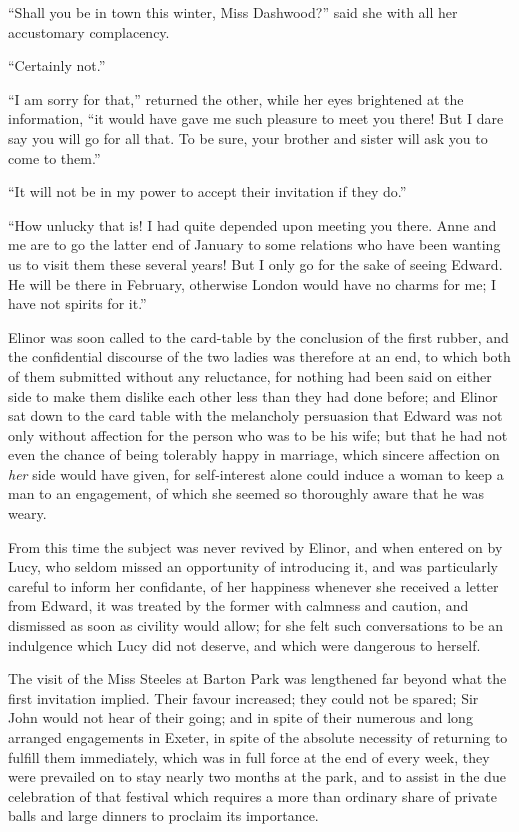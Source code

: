 ``Shall you be in town this winter, Miss Dashwood?''
said she with all her accustomary complacency.

``Certainly not.''

``I am sorry for that,'' returned the other,
while her eyes brightened at the information,
``it would have gave me such pleasure to meet you there!
But I dare say you will go for all that.  To be sure,
your brother and sister will ask you to come to them.''

``It will not be in my power to accept their invitation
if they do.''

``How unlucky that is! I had quite depended upon
meeting you there.  Anne and me are to go the latter end
of January to some relations who have been wanting us to
visit them these several years!  But I only go for the sake
of seeing Edward.  He will be there in February, otherwise
London would have no charms for me; I have not spirits for it.''

Elinor was soon called to the card-table by the
conclusion of the first rubber, and the confidential
discourse of the two ladies was therefore at an end,
to which both of them submitted without any reluctance,
for nothing had been said on either side to make them
dislike each other less than they had done before;
and Elinor sat down to the card table with the melancholy
persuasion that Edward was not only without affection
for the person who was to be his wife; but that he had
not even the chance of being tolerably happy in marriage,
which sincere affection on \emph{her} side would have given,
for self-interest alone could induce a woman to keep a man
to an engagement, of which she seemed so thoroughly aware
that he was weary.

From this time the subject was never revived by Elinor,
and when entered on by Lucy, who seldom missed an opportunity
of introducing it, and was particularly careful to inform
her confidante, of her happiness whenever she received a letter
from Edward, it was treated by the former with calmness
and caution, and dismissed as soon as civility would allow;
for she felt such conversations to be an indulgence which
Lucy did not deserve, and which were dangerous to herself.

The visit of the Miss Steeles at Barton Park was
lengthened far beyond what the first invitation implied.
Their favour increased; they could not be spared;
Sir John would not hear of their going; and in spite
of their numerous and long arranged engagements in Exeter,
in spite of the absolute necessity of returning to fulfill
them immediately, which was in full force at the end
of every week, they were prevailed on to stay nearly two
months at the park, and to assist in the due celebration
of that festival which requires a more than ordinary
share of private balls and large dinners to proclaim
its importance.



